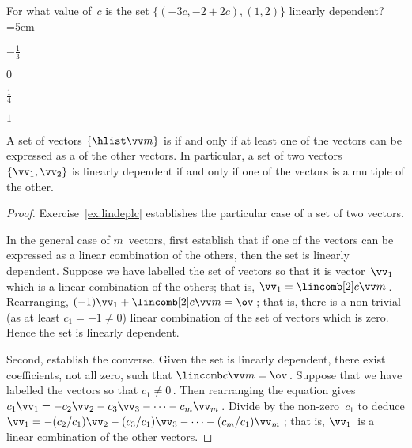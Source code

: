 \begin{activity}
For what value of~\(c\) is the set \(\{(-3c,-2+2c),(1,2)\}\) linearly dependent?
\partswidth=5em
\begin{parts}
\item \(-\frac13\)
\item \(0\)
\item \(\frac14\)\actans
\item \(1\)
\end{parts}
\end{activity}




\begin{theorem} \label{thm:lindeplc} 
A set of vectors \(\{\hlist\vv m\}\) is  if and only if at least one of the vectors can be expressed as a  of the other vectors.
In particular, a set of two vectors \(\{\vv_1,\vv_2\}\) is linearly dependent if and only if one of the vectors is a multiple of the other.
\end{theorem}

\begin{proof} 
Exercise~\ref{ex:lindeplc} establishes the particular case of a set of two vectors.

In the general case of \(m\)~vectors, first establish that if one of the vectors can be expressed as a {linear combination} of the others, then the set is linearly dependent.
Suppose we have labelled the set of vectors so that it is vector~\(\vv_1\) which is a linear combination of the others; that is, \(\vv_1=\lincomb[2]c\vv m\)\,.
Rearranging, \((-1)\vv_1+\lincomb[2]c\vv m=\ov\)\,; that is, there is a non-trivial (as at least \(c_1=-1\neq0\)) linear combination of the set of vectors which is zero.
Hence the set is linearly dependent.

Second, establish the converse.  
Given the set is linearly dependent, there exist coefficients, not all zero, such that \(\lincomb c\vv m=\ov\)\,.  
Suppose that we have labelled the vectors so that \(c_1\neq 0\)\,.  
Then rearranging the equation gives
\(c_1\vv_1=-c_2\vv_2-c_3\vv_3-\cdots-c_m\vv_m\)\,.
Divide by the non-zero~\(c_1\) to deduce
\(\vv_1=-(c_2/c_1)\vv_2-(c_3/c_1)\vv_3-\cdots-(c_m/c_1)\vv_m\)\,;
that is, \(\vv_1\)~is a linear combination of the other vectors.
\end{proof}


